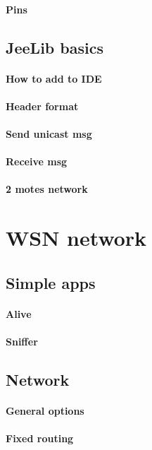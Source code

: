 \documentclass[12pt,titlepage]{article}
\begin{document}
        \paragraph{Pins}

    \subsection{JeeLib basics}
        \paragraph{How to add to IDE}
        \paragraph{Header format}
        \paragraph{Send unicast msg}
        \paragraph{Receive msg}
        \paragraph{2 motes network}

\section{WSN network}
    \subsection{Simple apps}
        \paragraph{Alive}
        \paragraph{Sniffer}

    \subsection{Network}
        \paragraph{General options}
        \paragraph{Fixed routing}
\end{document}
